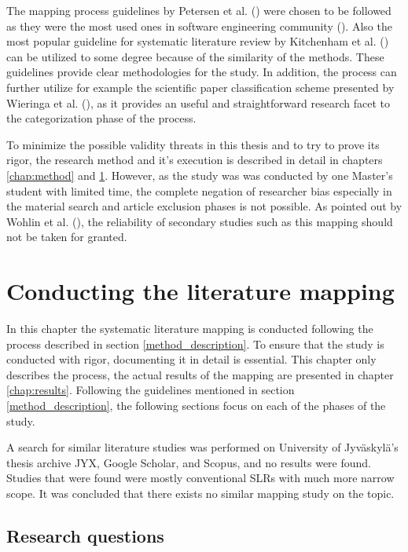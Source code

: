 \documentclass[utf8,english]{gradu3}
\begin{document}
The mapping process guidelines by Petersen et al.
(\cite*{petersen2008,petersen2015}) were chosen to be followed as they were the
most used ones in software engineering community (\cite{petersen2015}). Also the
most popular guideline for systematic literature review by Kitchenham et al.
(\cite*{kitchenham2007}) can be utilized to some degree because of the similarity
of the methods. These guidelines provide clear methodologies for the study. In
addition, the process can further utilize for example the scientific paper
classification scheme presented by Wieringa et al. (\cite{wieringa2006}), as it
provides an useful and straightforward research facet to the categorization
phase of the process.

To minimize the possible validity threats in this thesis and to try to prove its
rigor, the research method and it's execution is described in detail in chapters
\ref{chap:method} and \ref{chap:conducting}. However, as the study was was
conducted by one Master's student with limited time, the complete negation of
researcher bias especially in the material search and article exclusion phases
is not possible. As pointed out by Wohlin et al. (\cite*{wohlin2013}), the
reliability of secondary studies such as this mapping should not be taken for
granted.


\chapter{Conducting the literature mapping}
\label{chap:conducting}

In this chapter the systematic literature mapping is conducted following the
process described in section \ref{method_description}. To ensure that the study is
conducted with rigor, documenting it in detail is essential. This chapter only
describes the process, the actual results of the mapping are presented in
chapter \ref{chap:results}. Following the guidelines mentioned in section
\ref{method_description}, the following sections focus on each of the phases of
the study.

A search for similar literature studies was performed on University of
Jyväskylä's thesis archive JYX, Google Scholar, and Scopus, and no results were
found. Studies that were found were mostly conventional SLRs with much more
narrow scope. It was concluded that there exists no similar mapping study on the
topic.

\section{Research questions}
\end{document}
